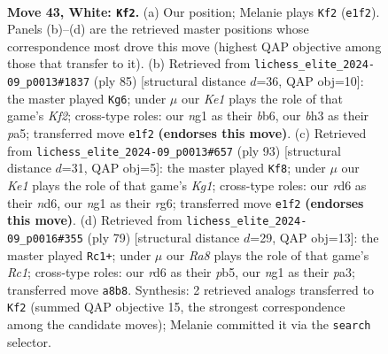 \documentclass[11pt]{article}
\begin{document}
\clearpage

\begin{figure}[p]\centering
\begin{subfigure}{0.46\textwidth}\centering
\resizebox{\linewidth}{!}{%
\newchessgame
\chessboard[
  setfen={R7/5pkp/3r2p1/8/1p2P3/6Pb/7P/4K1nr w - - 2 43},
  showmover=false,
  pgfstyle=straightmove, color=movearrow, markmove={e1-f2}
]}
\caption{}
\end{subfigure}\hfill
\begin{subfigure}{0.46\textwidth}\centering
\resizebox{\linewidth}{!}{%
\newchessgame
\chessboard[
  setfen={8/5k2/pB5p/P5p1/1R3p2/5P1P/6PK/3r4 b - - 0 43},
  showmover=false,
  pgfstyle=straightmove, color=movearrow, markmove={f7-g6}
]}
\caption{}
\end{subfigure}
\\[4pt]
\begin{subfigure}{0.46\textwidth}\centering
\resizebox{\linewidth}{!}{%
\newchessgame
\chessboard[
  setfen={6k1/8/2pN2R1/6Pp/4PP2/pPb1K2P/r7/8 b - - 0 47},
  showmover=false,
  pgfstyle=straightmove, color=movearrow, markmove={g8-f8}
]}
\caption{}
\end{subfigure}\hfill
\begin{subfigure}{0.46\textwidth}\centering
\resizebox{\linewidth}{!}{%
\newchessgame
\chessboard[
  setfen={2r5/8/7p/1P2R1p1/5p2/P2P1P1P/3k1NP1/6K1 b - - 0 40},
  showmover=false,
  pgfstyle=straightmove, color=movearrow, markmove={c8-c1}
]}
\caption{}
\end{subfigure}
\caption{\textbf{Move 43, White: \texttt{Kf2}.} (a) Our position; Melanie plays \texttt{Kf2} (\texttt{e1f2}). Panels (b)--(d) are the retrieved master positions whose correspondence most drove this move (highest QAP objective among those that transfer to it). (b) Retrieved from \texttt{lichess\_elite\_2024-09\_p0013\#1837} (ply 85) [structural distance $d$=36, QAP obj=10]: the master played \texttt{Kg6}; under $\mu$ our \emph{Ke1} plays the role of that game's \emph{Kf2}; cross-type roles: our \emph{n}g1 as their \emph{b}b6, our \emph{b}h3 as their \emph{p}a5; transferred move \texttt{e1f2} \textbf{(endorses this move)}. (c) Retrieved from \texttt{lichess\_elite\_2024-09\_p0013\#657} (ply 93) [structural distance $d$=31, QAP obj=5]: the master played \texttt{Kf8}; under $\mu$ our \emph{Ke1} plays the role of that game's \emph{Kg1}; cross-type roles: our \emph{r}d6 as their \emph{n}d6, our \emph{n}g1 as their \emph{r}g6; transferred move \texttt{e1f2} \textbf{(endorses this move)}. (d) Retrieved from \texttt{lichess\_elite\_2024-09\_p0016\#355} (ply 79) [structural distance $d$=29, QAP obj=13]: the master played \texttt{Rc1+}; under $\mu$ our \emph{Ra8} plays the role of that game's \emph{Rc1}; cross-type roles: our \emph{r}d6 as their \emph{p}b5, our \emph{n}g1 as their \emph{p}a3; transferred move \texttt{a8b8}. Synthesis: 2 retrieved analogs transferred to \texttt{Kf2} (summed QAP objective 15, the strongest correspondence among the candidate moves); Melanie committed it via the \texttt{search} selector.}
\label{fig:thought-m84}
\end{figure}
\end{document}
